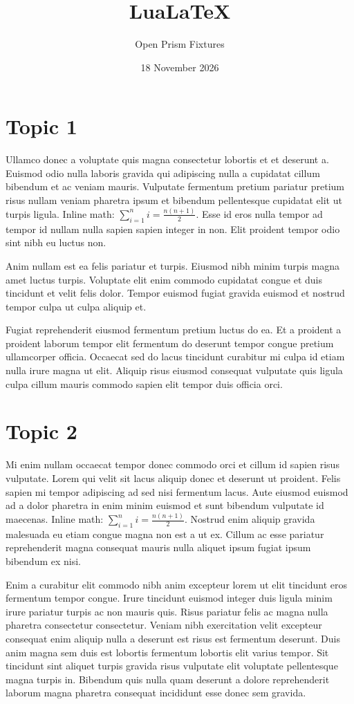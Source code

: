 \documentclass[11pt,a4paper]{article}
\title{LuaLaTeX}
\author{Open Prism Fixtures}
\date{18 November 2026}
\begin{document}
\maketitle

\section{Topic 1}
Ullamco donec a voluptate quis magna consectetur lobortis et et deserunt
a. Euismod odio nulla laboris gravida qui adipiscing nulla a cupidatat
cillum bibendum et ac veniam mauris. Vulputate fermentum pretium
pariatur pretium risus nullam veniam pharetra ipsum et bibendum
pellentesque cupidatat elit ut turpis ligula. Inline math:
$\sum_{i=1}^{n} i = \frac{n(n+1)}{2}$. Esse id eros nulla tempor ad
tempor id nullam nulla sapien sapien integer in non. Elit proident
tempor odio sint nibh eu luctus non.

Anim nullam est ea felis pariatur et turpis. Eiusmod nibh minim turpis
magna amet luctus turpis. Voluptate elit enim commodo cupidatat congue
et duis tincidunt et velit felis dolor. Tempor euismod fugiat gravida
euismod et nostrud tempor culpa ut culpa aliquip et.

Fugiat reprehenderit eiusmod fermentum pretium luctus do ea. Et a
proident a proident laborum tempor elit fermentum do deserunt tempor
congue pretium ullamcorper officia. Occaecat sed do lacus tincidunt
curabitur mi culpa id etiam nulla irure magna ut elit. Aliquip risus
eiusmod consequat vulputate quis ligula culpa cillum mauris commodo
sapien elit tempor duis officia orci.

\section{Topic 2}
Mi enim nullam occaecat tempor donec commodo orci et cillum id sapien
risus vulputate. Lorem qui velit sit lacus aliquip donec et deserunt ut
proident. Felis sapien mi tempor adipiscing ad sed nisi fermentum lacus.
Aute eiusmod euismod ad a dolor pharetra in enim minim euismod et sunt
bibendum vulputate id maecenas. Inline math: $\sum_{i=1}^{n} i =
\frac{n(n+1)}{2}$. Nostrud enim aliquip gravida malesuada eu etiam
congue magna non est a ut ex. Cillum ac esse pariatur reprehenderit
magna consequat mauris nulla aliquet ipsum fugiat ipsum bibendum ex
nisi.

Enim a curabitur elit commodo nibh anim excepteur lorem ut elit
tincidunt eros fermentum tempor congue. Irure tincidunt euismod integer
duis ligula minim irure pariatur turpis ac non mauris quis. Risus
pariatur felis ac magna nulla pharetra consectetur consectetur. Veniam
nibh exercitation velit excepteur consequat enim aliquip nulla a
deserunt est risus est fermentum deserunt. Duis anim magna sem duis est
lobortis fermentum lobortis elit varius tempor. Sit tincidunt sint
aliquet turpis gravida risus vulputate elit voluptate pellentesque magna
turpis in. Bibendum quis nulla quam deserunt a dolore reprehenderit
laborum magna pharetra consequat incididunt esse donec sem gravida.
\end{document}
